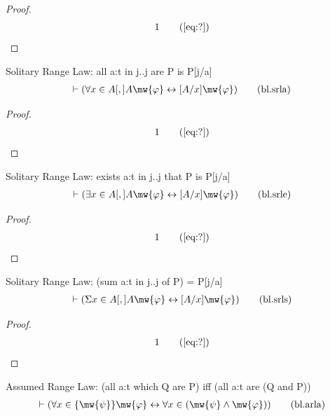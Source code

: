 \begin{proof}
\begin{align}
  1 &&  & &(\mbox{\ref{eq:?}})\notag
\end{align}
\end{proof}

\begin{lemma} Solitary Range Law: all a:t in j..j are P
is P[j/a]
\begin{align}
\vdash ( \forall x \in A [,] A \mw{\varphi} \leftrightarrow [ A / x ]
    \mw{\varphi} )\label{eq:bl.srla}\tag{bl.srla}
\end{align}
\end{lemma}

\begin{proof}
\begin{align}
  1 &&  & &(\mbox{\ref{eq:?}})\notag
\end{align}
\end{proof}

\begin{lemma} Solitary Range Law: exists a:t in j..j that
P is P[j/a]
\begin{align}
\vdash ( \exists x \in A [,] A \mw{\varphi} \leftrightarrow [ A / x ]
    \mw{\varphi} )\label{eq:bl.srle}\tag{bl.srle}
\end{align}
\end{lemma}

\begin{proof}
\begin{align}
  1 &&  & &(\mbox{\ref{eq:?}})\notag
\end{align}
\end{proof}

\begin{lemma} Solitary Range Law: (sum a:t in j..j of P)
= P[j/a]
\begin{align}
\vdash ( \Sigma x \in A [,] A \mw{\varphi} \leftrightarrow [ A / x ]
    \mw{\varphi} )\label{eq:bl.srls}\tag{bl.srls}
\end{align}
\end{lemma}

\begin{proof}
\begin{align}
  1 &&  & &(\mbox{\ref{eq:?}})\notag
\end{align}
\end{proof}

\begin{lemma} Assumed Range Law: (all a:t which Q are P)
iff (all a:t are (Q and P))
\begin{align}
\vdash ( \forall x \in \{ \mw{\psi} \} \mw{\varphi} \leftrightarrow \forall x
    \in ( \mw{\psi} \wedge \mw{\varphi} ) )\label{eq:bl.arla}\tag{bl.arla}
\end{align}
\end{lemma}

